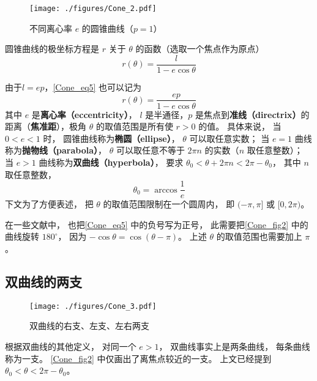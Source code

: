 

\begin{figure}[ht]
\centering
\texttt{[image: ./figures/Cone\_2.pdf]}
\caption{不同离心率 $e$ 的圆锥曲线（$p = 1$）} \label{Cone_fig2}
\end{figure}

圆锥曲线的极坐标方程是 $r$ 关于 $\theta$ 的函数（选取一个焦点作为原点）
\begin{equation}\label{Cone_eq5}
r(\theta)  = \frac{l}{1 - e\cos \theta }
\end{equation}

由于$l=ep$，\autoref{Cone_eq5} 也可以记为
\begin{equation}\label{Cone_eq3}
r(\theta) = \frac{ep}{1 - e\cos \theta }
\end{equation}
其中 $e$ 是\textbf{离心率（eccentricity）}， $l$ 是半通径，$p$ 是焦点到\textbf{准线（directrix）}的距离（\textbf{焦准距}），极角 $\theta$ 的取值范围是所有使 $r>0$ 的值。 具体来说， 当 $0 < e < 1$ 时， 圆锥曲线称为\textbf{椭圆（ellipse）}， $\theta$ 可以取任意实数； 当 $e = 1$ 曲线称为\textbf{抛物线（parabola）}， $\theta$ 可以取任意不等于 $2\pi n$ 的实数（$n$ 取任意整数）； 当 $e > 1$ 曲线称为\textbf{双曲线（hyperbola）}， 要求 $\theta_0< \theta + 2\pi n < 2\pi-\theta_0$， 其中 $n$ 取任意整数，
\begin{equation}
\theta_0 = \arccos\frac{1}{e}
\end{equation}
下文为了方便表述， 把 $\theta$ 的取值范围限制在一个圆周内， 即 $(-\pi,\pi]$ 或 $[0, 2\pi)$。

在一些文献中， 也把\autoref{Cone_eq5} 中的负号写为正号， 此需要把\autoref{Cone_fig2} 中的曲线旋转 $180^\circ$， 因为 $-\cos\theta = \cos(\theta - \pi)$。 上述 $\theta$ 的取值范围也需要加上 $\pi$。

\subsection{双曲线的两支}
\begin{figure}[ht]
\centering
\texttt{[image: ./figures/Cone\_3.pdf]}
\caption{双曲线的右支、左支、左右两支} \label{Cone_fig3}
\end{figure}
根据双曲线的其他定义， 对同一个 $e>1$， 双曲线事实上是两条曲线， 每条曲线称为一支。 \autoref{Cone_fig2} 中仅画出了离焦点较近的一支。 上文已经提到 $\theta_0< \theta < 2\pi-\theta_0$。

